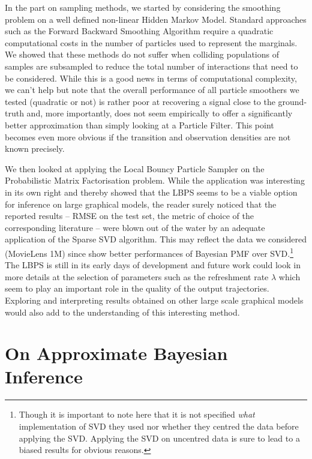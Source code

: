 In the part on sampling methods, we started by considering the smoothing problem on a well defined non-linear Hidden Markov Model. Standard approaches such as the Forward Backward Smoothing Algorithm require a quadratic computational costs in the number of particles used to represent the marginals. We showed that these methods do not suffer when colliding populations of samples are subsampled to reduce the total number of interactions that need to be considered. While this is a good news in terms of computational complexity, we can't help but note that the overall performance of all particle smoothers we tested (quadratic or not) is rather poor at recovering a signal close to the ground-truth and, more importantly, does not seem empirically to offer a significantly better approximation than simply looking at a Particle Filter. This point becomes even more obvious if the transition and observation densities are not known precisely.

We then looked at applying the Local Bouncy Particle Sampler on the Probabilistic Matrix Factorisation problem. While the application was interesting in its own right and thereby showed that the LBPS seems to be a viable option for inference on large graphical models, the reader surely noticed that the reported results -- RMSE on the test set, the metric of choice of the corresponding literature -- were blown out of the water by an adequate application of the Sparse SVD algorithm. This may reflect the data we considered (MovieLens 1M) since \cite{mnih08} show better performances of Bayesian PMF over SVD.\footnote{Though it is important to note here that it is not specified \emph{what} implementation of SVD they used nor whether they centred the data before applying the SVD. Applying the SVD on uncentred data is sure to lead to a biased results for obvious reasons.} The LBPS is still in its early days of development and future work could look in more details at the selection of parameters such as the refreshment rate $\lambda$ which seem to play an important role in the quality of the output trajectories. Exploring and interpreting results obtained on other large scale graphical models would also add to the understanding of this interesting method.

\section{On Approximate Bayesian Inference}

